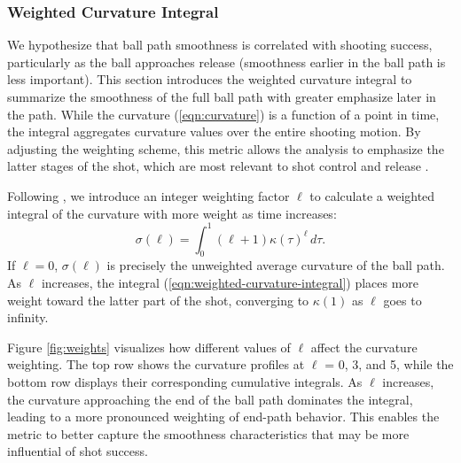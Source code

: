 \documentclass[Review,sageh,times,doublespace]{sagej}
\begin{document}
        \subsubsection{Weighted Curvature Integral}
        \label{sec:weighted-curvature-integral}
    
        
          We hypothesize that ball path smoothness is correlated with shooting success, particularly as the ball approaches release (smoothness earlier in the ball path is less important). This section introduces the weighted curvature integral to summarize the smoothness of the full ball path with greater emphasize later in the path. While the curvature (\ref{eqn:curvature}) is a function of a point in time, the integral aggregates curvature values over the entire shooting motion. By adjusting the weighting scheme, this metric allows the analysis to emphasize the latter stages of the shot, which are most relevant to shot control and release \citep{button_examining_2003}.

          Following \citet{slegers_role_2024}, we introduce an integer weighting factor $\ell$ to calculate a weighted integral of the curvature with more weight as time increases:
          \begin{equation}
          \label{eqn:weighted-curvature-integral}
            \sigma(\ell) = \int_{0}^{1} (\ell + 1) \kappa(\tau)^\ell \, d\tau.
          \end{equation}
          If \(\ell = 0\), \(\sigma(\ell)\) is precisely the unweighted average curvature of the ball path. As $\ell$ increases, the integral (\ref{eqn:weighted-curvature-integral}) places more weight toward the latter part of the shot, converging to \(\kappa(1)\) as $\ell$ goes to infinity. 
    
          Figure \ref{fig:weights} visualizes how different values of $\ell$ affect the curvature weighting. The top row shows the curvature profiles at $\ell$ = 0, 3, and 5, while the bottom row displays their corresponding cumulative integrals. As $\ell$ increases, the curvature approaching the end of the ball path dominates the integral, leading to a more pronounced weighting of end-path behavior. This enables the metric to better capture the smoothness characteristics that may be more influential of shot success.
\end{document}
